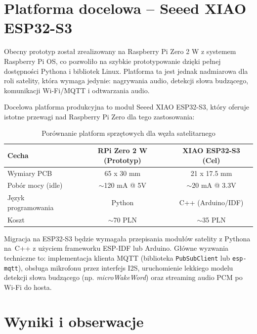 \documentclass[12pt,a4paper]{article}
\begin{document}
\section{Platforma docelowa – Seeed XIAO ESP32-S3}
Obecny prototyp został zrealizowany na Raspberry Pi Zero 2 W z systemem Raspberry Pi OS, co pozwoliło na szybkie prototypowanie dzięki pełnej dostępności Pythona i bibliotek Linux. Platforma ta jest jednak nadmiarowa dla roli satelity, która wymaga jedynie: nagrywania audio, detekcji słowa budzącego, komunikacji Wi-Fi/MQTT i odtwarzania audio.

\medbreak

Docelowa platforma produkcyjna to moduł Seeed XIAO ESP32-S3, który oferuje istotne przewagi nad Raspberry Pi Zero dla tego zastosowania:

\begin{table}[htbp]
\centering
\caption{Porównanie platform sprzętowych dla węzła satelitarnego}
\label{tab:porownanie}
\begin{tabular}{lcc}
\toprule
\textbf{Cecha} & \textbf{RPi Zero 2 W (Prototyp)} & \textbf{XIAO ESP32-S3 (Cel)} \\
\midrule
Wymiary PCB & 65 x 30 mm & 21 x 17.5 mm \\
Pobór mocy (idle) & $\sim$120 mA @ 5V & $\sim$20 mA @ 3.3V \\
Język programowania & Python & C++ (Arduino/IDF) \\
Koszt & $\sim$70 PLN & $\sim$35 PLN \\
\bottomrule
\end{tabular}
\end{table}

Migracja na ESP32-S3 będzie wymagała przepisania modułów satelity z Pythona na~C++ z użyciem frameworku ESP-IDF lub Arduino. Główne wyzwania techniczne to: implementacja klienta MQTT (biblioteka \texttt{PubSubClient} lub \texttt{esp-mqtt}), obsługa mikrofonu przez interfejs I2S, uruchomienie lekkiego modelu detekcji słowa budzącego (np. \textit{microWakeWord}) oraz streaming audio PCM po Wi-Fi do hosta.

\section{Wyniki i obserwacje}
\end{document}
